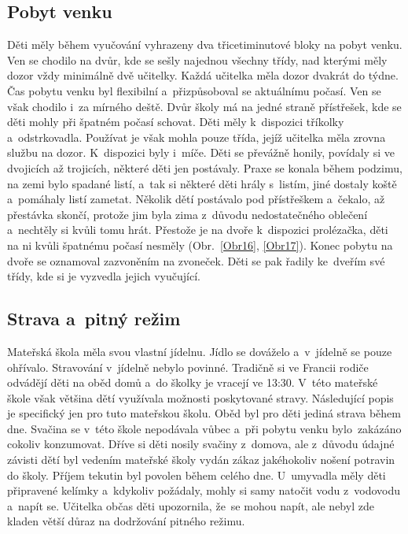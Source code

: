 		\subsection{Pobyt venku}
		\label{prestavka}
			Děti měly během vyučování vyhrazeny dva třicetiminutové bloky na pobyt venku. Ven se chodilo na dvůr, kde se sešly najednou všechny třídy, nad kterými měly dozor vždy minimálně dvě učitelky. Každá učitelka měla dozor dvakrát do týdne. Čas pobytu venku byl flexibilní a~přizpůsoboval se aktuálnímu počasí. Ven se však chodilo i~za mírného deště. Dvůr školy má na jedné straně přístřešek, kde se děti mohly při špatném počasí schovat. Děti měly k dispozici tříkolky a~odstrkovadla. Používat je však mohla pouze třída, jejíž učitelka měla zrovna službu na dozor. K dispozici byly i~míče. Děti se převážně honily, povídaly si ve dvojicích až trojicích, některé děti jen postávaly. Praxe se konala během podzimu, na zemi bylo spadané listí, a~tak si některé děti hrály s listím, jiné dostaly koště a pomáhaly listí zametat. Několik dětí postávalo pod přístřeškem a~čekalo, až přestávka skončí, protože jim byla zima z důvodu nedostatečného oblečení a~nechtěly si kvůli tomu hrát. Přestože je na dvoře k dispozici prolézačka, děti na ni kvůli špatnému počasí nesměly (Obr.~\ref{Obr16}, \ref{Obr17}). 
			Konec pobytu na dvoře se oznamoval zazvoněním na zvoneček. Děti se pak řadily ke dveřím své třídy, kde si je vyzvedla jejich vyučující. 

		\subsection{Strava a~pitný režim}
			Mateřská škola měla svou vlastní jídelnu. Jídlo se dováželo a~v~jídelně se pouze ohřívalo. Stravování v jídelně nebylo povinné. Tradičně si ve Francii rodiče odvádějí děti na oběd domů a~do školky je vracejí ve 13:30. V~této mateřské škole však většina dětí využívala možnosti poskytované stravy. 
			Následující popis je specifický jen pro tuto mateřskou školu. Oběd byl pro děti jediná strava během dne. Svačina se v této škole nepodávala vůbec a~při pobytu venku bylo zakázáno cokoliv konzumovat. Dříve si děti nosily svačiny z~domova, ale z~důvodu údajné závisti dětí byl vedením mateřské školy vydán zákaz jakéhokoliv nošení potravin do školy. 
			Příjem tekutin byl povolen během celého dne. U~umyvadla měly děti připravené kelímky a~kdykoliv požádaly, mohly si samy natočit vodu z vodovodu a~napít se. Učitelka občas děti upozornila, že se mohou napít, ale nebyl zde kladen větší důraz na dodržování pitného režimu.

